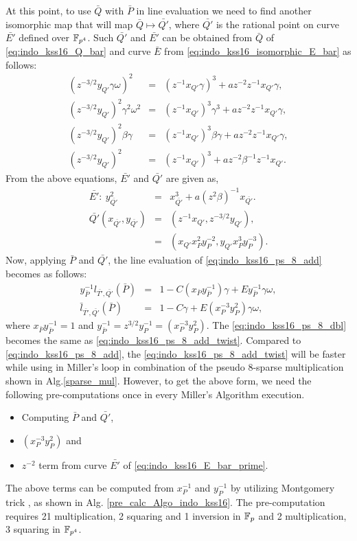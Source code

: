 At this point, to use $\bar{Q}$ with $\bar{P}$ in line evaluation we need to find another isomorphic map that will map $\bar{Q} \mapsto \bar{Q'}$, where $\bar{Q'}$ is the rational point on curve  $\bar{E'}$ defined over $\mathbb{F}_{p^4}$. Such $\bar{Q'}$ and $\bar{E'}$ can be obtained from $\bar{Q}$ of \eqref{eq:indo_kss16_Q_bar} and curve $\bar{E}$ from \eqref{eq:indo_kss16_isomorphic_E_bar} as follows:
\begin{eqnarray} 
(z^{-3/2}y_{Q'}\gamma \omega )^2 &=& (z^{-1}x_{Q'}\gamma)^3+az^{-2}z^{-1}x_{Q'}\gamma, \nonumber \\
(z^{-3/2}y_{Q'})^2\gamma^2 \omega^2 &=& (z^{-1}x_{Q'})^3\gamma^3+az^{-2}z^{-1}x_{Q'}\gamma, \nonumber \\
(z^{-3/2}y_{Q'})^2 \beta \gamma &=& (z^{-1}x_{Q'})^3 \beta \gamma+az^{-2}z^{-1}x_{Q'}\gamma, \nonumber \\
(z^{-3/2}y_{Q'})^2  &=& (z^{-1}x_{Q'})^3+az^{-2}\beta^{-1} z^{-1}x_{Q'}. \nonumber
\end{eqnarray}
From the above equations, $\bar{E'}$ and $\bar{Q'}$ are given as,
\begin{eqnarray}
\bar{E'}: ~y_{\bar{Q'}}^2 & = & x_{\bar{Q'}}^3+a(z^2\beta)^{-1}x_{\bar{Q'}}. \label{eq:indo_kss16_E_bar_prime}\\
\bar{Q'}(x_{\bar{Q'}}, y_{\bar{Q'}}) & = & (z^{-1}x_{Q'}, z^{-3/2}y_{Q'}), \nonumber \\
& = &(x_{Q'} x_P^2y_P^{-2},y_{Q'} x_P^3y_{P}^{-3}) \label{eq:indo_kss16_Q_bar_prime}. 
\end{eqnarray}
Now, applying $\bar{P}$ and $\bar{Q'}$, the line evaluation of  \eqref{eq:indo_kss16_ps_8_add} becomes as follows:
\begin{eqnarray}
y_{\bar{P}}^{-1} l_{\bar{T'},\bar{Q'}}(\bar{P})&=& 1-C(x_{\bar{P}}y_{\bar{P}}^{-1})\gamma+E y_{\bar{P}}^{-1}\gamma \omega,  \nonumber \\
\bar{l}_{\bar{T'},\bar{Q'}}(\bar{P}) &=& 1 -C\gamma+E (x_{P}^{-3} y_{P}^2)\gamma \omega, \label{eq:indo_kss16_ps_8_add_twist}
\end{eqnarray}
where $x_{\bar{P}}y_{\bar{P}}^{-1}=1$ and $y_{\bar{P}}^{-1} = z^{3/2}y_{P}^{-1}=(x_{P}^{-3} y_{P}^2)$. The \eqref{eq:indo_kss16_ps_8_dbl} becomes the same as \eqref{eq:indo_kss16_ps_8_add_twist}. 
Compared to \eqref{eq:indo_kss16_ps_8_add}, the \eqref{eq:indo_kss16_ps_8_add_twist} will be faster while using in Miller's loop in combination of the pseudo 8-sparse multiplication shown in Alg.\ref{sparse_mul}.
However, to get the above form, we need the following pre-computations once in every Miller's Algorithm execution.
\begin{itemize}
	\item Computing $\bar{P}$ and $\bar{Q'}$,
	\item $(x_{P}^{-3} y_{P}^{2})$ and
	\item $z^{-2}$ term from curve $\bar{E'}$ of \eqref{eq:indo_kss16_E_bar_prime}.
\end{itemize}
The above terms can be computed from $x_{P}^{-1}$ and $y_P^{-1}$ by utilizing Montgomery trick \cite{mont_trick}, as shown in Alg. \ref{pre_calc_Algo_indo_kss16}. 
The pre-computation requires 21 multiplication, 2 squaring and 1 inversion in ${\mathbb{F}}_{p}$ and 2 multiplication, 3 squaring in $\mathbb{F}_{p^4}$.

